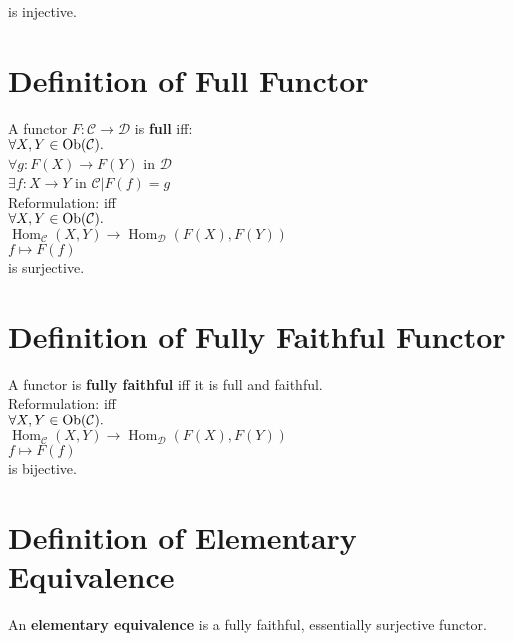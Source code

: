 \documentclass[a4paper, twoside, english, 11pt]{book}
\DeclareMathOperator{\Hom}{Hom}
\DeclareMathOperator{\Ob}{Ob}
\newcommand{\C}{\mathcal C}
\newcommand{\D}{\mathcal D}
\begin{document}
\noindent
is injective.




\section{Definition of Full Functor}

A functor $F : \C \rightarrow \D$ is \textbf{full} iff: \\

$\forall X, Y \in \Ob(\C) \ldotp$ \\
\indent
$\forall g : F(X) \rightarrow F(Y)$ in $\D$ \\
\indent
$\exists f : X \rightarrow Y$ in $\C | F(f) = g$ \\

\noindent
Reformulation: iff \\

$\forall X, Y \in \Ob(\C) \ldotp$ \\
\indent
$\Hom_\C(X, Y) \rightarrow \Hom_\D(F(X), F(Y))$ \\
\indent
$f \mapsto F(f)$ \\

\noindent
is surjective.



\section{Definition of Fully Faithful Functor}

A functor is \textbf{fully faithful} iff it is full and faithful. \\

\noindent
Reformulation: iff \\

$\forall X, Y \in \Ob(\C) \ldotp$ \\
\indent
$\Hom_\C(X, Y) \rightarrow \Hom_\D(F(X), F(Y))$ \\
\indent
$f \mapsto F(f)$ \\

\noindent
is bijective.



\section{Definition of Elementary Equivalence}

An \textbf{elementary equivalence} is a fully faithful, essentially surjective functor.
\end{document}
